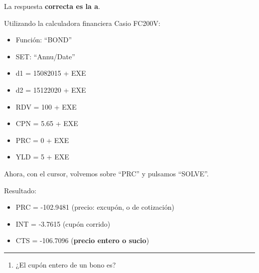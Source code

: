 \documentclass[
  letterpaper,
  DIV=11,
  numbers=noendperiod]{scrreprt}
\providecommand{\tightlist}{%
  \setlength{\itemsep}{0pt}\setlength{\parskip}{0pt}}\usepackage{longtable,booktabs,array}
\begin{document}
\begin{tcolorbox}[enhanced jigsaw, left=2mm, opacityback=0, colback=white, breakable, arc=.35mm, bottomrule=.15mm, rightrule=.15mm, toprule=.15mm, leftrule=.75mm, colframe=quarto-callout-tip-color-frame]
\begin{minipage}[t]{5.5mm}
\textcolor{quarto-callout-tip-color}{\faLightbulb}
\end{minipage}%
\begin{minipage}[t]{\textwidth - 5.5mm}

La respuesta \textbf{correcta es la a}.

Utilizando la calculadora financiera Casio FC200V:

\begin{itemize}
\item
  Función: ``BOND''
\item
  SET: ``Annu/Date''
\item
  d1 = 15082015 + EXE
\item
  d2 = 15122020 + EXE
\item
  RDV = 100 + EXE
\item
  CPN = 5.65 + EXE
\item
  PRC = 0 + EXE
\item
  YLD = 5 + EXE
\end{itemize}

Ahora, con el cursor, volvemos sobre ``PRC'' y pulsamos ``SOLVE''.

Resultado:

\begin{itemize}
\item
  PRC = -102.9481 (precio: excupón, o de cotización)
\item
  INT = -3.7615 (cupón corrido)
\item
  CTS = -106.7096 (\textbf{precio entero o sucio})
\end{itemize}

\end{minipage}%
\end{tcolorbox}

\begin{center}\rule{0.5\linewidth}{0.5pt}\end{center}

\begin{enumerate}
\def\labelenumi{\arabic{enumi}.}
\setcounter{enumi}{110}
\tightlist
\item
  ¿El cupón entero de un bono es?
\end{enumerate}
\end{document}
